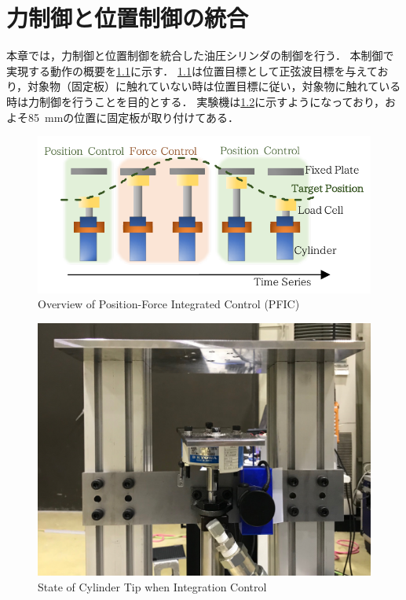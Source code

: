 \chapter{力制御と位置制御の統合}
\label{sec:IntegrationControl}
本章では，力制御と位置制御を統合した油圧シリンダの制御を行う．
本制御で実現する動作の概要を\figname\ref{fig5:forceandpositionIMAGE}に示す．
\figname\ref{fig5:forceandpositionIMAGE}は位置目標として正弦波目標を与えており，対象物（固定板）に触れていない時は位置目標に従い，対象物に触れている時は力制御を行うことを目的とする．
実験機は\figname\ref{fig:Integ_system}に示すようになっており，およそ\SI{85}{mm}の位置に固定板が取り付けてある．

\begin{figure}[t]
    \centering
        \includegraphics[keepaspectratio, scale=.9]{contents/IntegrationControl/figure/forceandpositionIMAGE.pdf}
        \caption{Overview of Position-Force Integrated Control (PFIC)}
        \label{fig5:forceandpositionIMAGE}
\end{figure}
\begin{figure}[t]
    \centering
        \includegraphics[keepaspectratio, width = .6\linewidth]{contents/IntegrationControl/figure/Integ_system.png}
        \caption{State of Cylinder Tip when Integration Control}
        \label{fig:Integ_system}
\end{figure}

